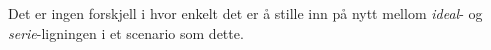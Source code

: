 Det er ingen forskjell i hvor enkelt det er å stille inn på nytt mellom {\it ideal}- og {\it serie}-ligningen i et scenario som dette.


